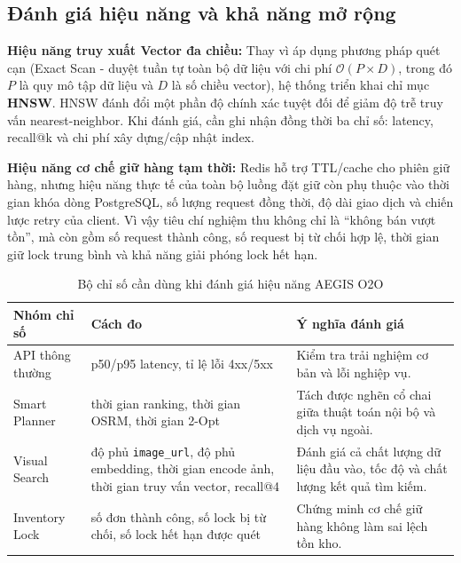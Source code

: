 \documentclass[12pt, a4paper]{article}
\begin{document}
\subsection{Đánh giá hiệu năng và khả năng mở rộng}

\textbf{Hiệu năng truy xuất Vector đa chiều:} Thay vì áp dụng phương pháp quét cạn (Exact Scan - duyệt tuần tự toàn bộ dữ liệu với chi phí $\mathcal{O}(P \times D)$, trong đó $P$ là quy mô tập dữ liệu và $D$ là số chiều vector), hệ thống triển khai chỉ mục \textbf{HNSW}. HNSW đánh đổi một phần độ chính xác tuyệt đối để giảm độ trễ truy vấn nearest-neighbor. Khi đánh giá, cần ghi nhận đồng thời ba chỉ số: latency, recall@k và chi phí xây dựng/cập nhật index.

\textbf{Hiệu năng cơ chế giữ hàng tạm thời:} Redis hỗ trợ TTL/cache cho phiên giữ hàng, nhưng hiệu năng thực tế của toàn bộ luồng đặt giữ còn phụ thuộc vào thời gian khóa dòng PostgreSQL, số lượng request đồng thời, độ dài giao dịch và chiến lược retry của client. Vì vậy tiêu chí nghiệm thu không chỉ là ``không bán vượt tồn'', mà còn gồm số request thành công, số request bị từ chối hợp lệ, thời gian giữ lock trung bình và khả năng giải phóng lock hết hạn.

\begin{table}[H]
\centering
\renewcommand{\arraystretch}{1.3}
\begin{tabular}{|p{4.0cm}|p{4.0cm}|p{6.0cm}|}
\hline
\textbf{Nhóm chỉ số} & \textbf{Cách đo} & \textbf{Ý nghĩa đánh giá} \\ \hline
API thông thường & p50/p95 latency, tỉ lệ lỗi 4xx/5xx & Kiểm tra trải nghiệm cơ bản và lỗi nghiệp vụ. \\ \hline
Smart Planner & thời gian ranking, thời gian OSRM, thời gian 2-Opt & Tách được nghẽn cổ chai giữa thuật toán nội bộ và dịch vụ ngoài. \\ \hline
Visual Search & độ phủ \texttt{image\_url}, độ phủ embedding, thời gian encode ảnh, thời gian truy vấn vector, recall@4 & Đánh giá cả chất lượng dữ liệu đầu vào, tốc độ và chất lượng kết quả tìm kiếm. \\ \hline
Inventory Lock & số đơn thành công, số lock bị từ chối, số lock hết hạn được quét & Chứng minh cơ chế giữ hàng không làm sai lệch tồn kho. \\ \hline
\end{tabular}
\caption{Bộ chỉ số cần dùng khi đánh giá hiệu năng AEGIS O2O}
\label{tab:performance_metrics}
\end{table}

\clearpage
\end{document}

